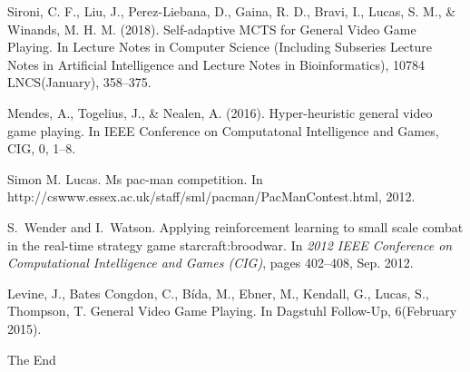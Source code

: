 \documentclass{beamer}
\begin{document}
\begin{frame}[allowframebreaks]
{\begin{thebibliography}{99}
    Sironi, C. F., Liu, J., Perez-Liebana, D., Gaina, R. D., Bravi, I., Lucas, S. M., \& Winands, M. H. M. (2018). 
    \newblock Self-adaptive MCTS for General Video Game Playing. 
    \newblock In Lecture Notes in Computer Science (Including Subseries Lecture Notes in Artificial Intelligence and Lecture Notes in Bioinformatics), 10784 LNCS(January), 358–375.

    Mendes, A., Togelius, J., \& Nealen, A. (2016). 
    \newblock Hyper-heuristic general video game playing. 
    \newblock In IEEE Conference on Computatonal Intelligence and Games, CIG, 0, 1–8.

    Simon M. Lucas. 
    \newblock Ms pac-man competition. 
    \newblock In http://cswww.essex.ac.uk/staff/sml/pacman/PacManContest.html, 2012.

    
    S.~{Wender} and I.~{Watson}.
    \newblock Applying reinforcement learning to small scale combat in the real-time strategy game starcraft:broodwar.
    \newblock In {\em 2012 IEEE Conference on Computational Intelligence and Games (CIG)}, pages 402--408, Sep. 2012.


    

    Levine, J., Bates Congdon, C., Bída, M., Ebner, M., Kendall, G., Lucas, S., Thompson, T.
    \newblock General Video Game Playing. 
    \newblock In Dagstuhl Follow-Up, 6(February 2015).

    \end{thebibliography}
}
\end{frame}


\begin{frame}
\Huge{\centerline{The End}}
\end{frame}

\end{document}
